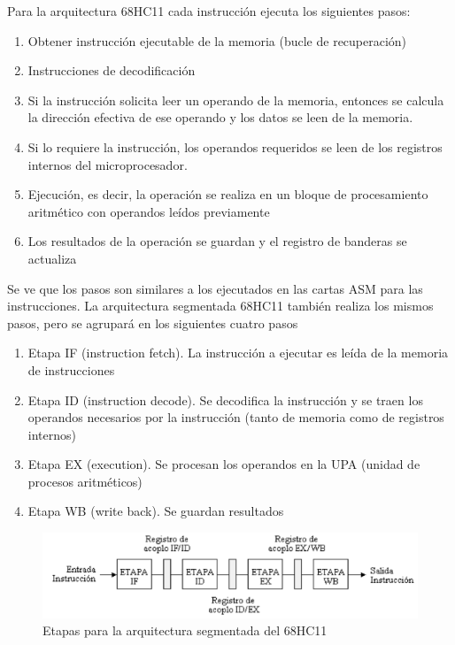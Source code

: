 \documentclass{IEEEtran}
\begin{document}
Para la arquitectura 68HC11 cada instrucción ejecuta los siguientes pasos:
\begin{enumerate}
\item Obtener instrucción ejecutable de la memoria (bucle de recuperación)
\item Instrucciones de decodificación
\item Si la instrucción solicita leer un operando de la memoria, entonces se calcula la dirección efectiva de ese operando y los datos se leen de la memoria.
\item Si lo requiere la instrucción, los operandos requeridos se leen de los registros internos del microprocesador.
\item Ejecución, es decir, la operación se realiza en un bloque de procesamiento aritmético con operandos leídos previamente
\item Los resultados de la operación se guardan y el registro de banderas se actualiza
\end{enumerate}

Se ve que los pasos son similares a los ejecutados en las cartas ASM para las instrucciones. La arquitectura segmentada 68HC11 también realiza los mismos pasos, pero se agrupará en los siguientes cuatro pasos
\begin{enumerate}
\item Etapa IF (instruction fetch). La instrucción a ejecutar es leída de la memoria de instrucciones
\item Etapa ID (instruction decode). Se decodifica la instrucción y se traen los operandos necesarios por la instrucción (tanto de memoria como de registros internos)
\item Etapa EX (execution). Se procesan los operandos en la UPA (unidad de procesos aritméticos)
\item Etapa WB (write back). Se guardan resultados
\end{enumerate}
\begin{figure}[htbp]
\centering
\includegraphics[width=.9\linewidth]{./img/etapas.png}
\caption{Etapas para la arquitectura segmentada del 68HC11}
\end{figure}
\end{document}
